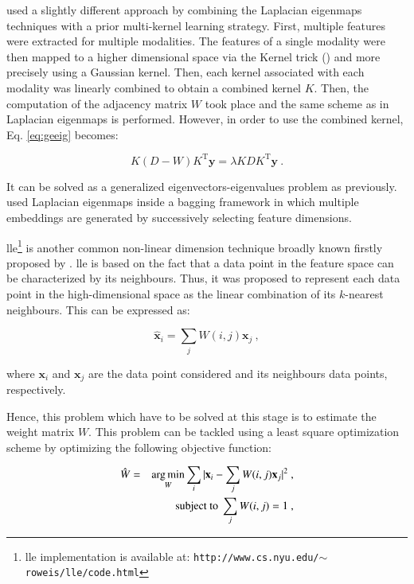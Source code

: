 \cite{Tiwari2009,Tiwari2013} used a slightly different approach by combining the Laplacian eigenmaps techniques with a prior multi-kernel learning strategy. First, multiple features were extracted for multiple modalities. The features of a single modality were then mapped to a higher dimensional space via the Kernel trick (\cite{Aizerman1964}) and more precisely using a Gaussian kernel. Then, each kernel associated with each modality was linearly combined to obtain a combined kernel $K$. Then, the computation of the adjacency matrix $W$ took place and the same scheme as in Laplacian eigenmaps is performed. However, in order to use the combined kernel, Eq. \eqref{eq:geeig} becomes:

\begin{equation}
	K (D-W) K^{\text{T}} \mathbf{y} = \lambda K D K^{\text{T}} \mathbf{y} \ .
	\label{eq:sesmik}
\end{equation}

It can be solved as a generalized eigenvectors-eigenvalues problem as previously. \cite{Viswanath2011} used Laplacian eigenmaps inside a bagging framework in which multiple embeddings are generated by successively selecting feature dimensions.

\ac{lle}\footnote{\ac{lle} implementation is available at: \texttt{http://www.cs.nyu.edu/\allowbreak $\sim$roweis/lle/code.html}} is another common non-linear dimension technique broadly known firstly proposed by \cite{Roweis2000}. \ac{lle} is based on the fact that a data point in the feature space can be characterized by its neighbours. Thus, it was proposed to represent each data point in the high-dimensional space as the linear combination of its $k$-nearest neighbours. This can be expressed as:

\begin{equation}
	\hat{\mathbf{x}}_i = \sum_j W(i,j) \mathbf{x}_j \ ,
	\label{eq:lincomlle}
\end{equation}

\noindent where $\mathbf{x}_i$ and $\mathbf{x}_j$ are the data point considered and its neighbours data points, respectively.

Hence, this problem which have to be solved at this stage is to estimate the weight matrix $W$. This problem can be tackled using a least square optimization scheme by optimizing the following objective function:

\begin{eqnarray}
	\hat{W} & = & \operatorname*{arg\,min}_{W} \sum_i | \mathbf{x}_i - \sum_j W(i,j)\mathbf{x}_j |^{2} \ , \label{eq:lslle} \\
	&& \text{subject to } \sum_j W(i,j) = 1 \ , \nonumber
\end{eqnarray}

